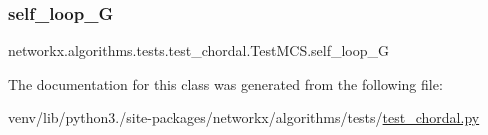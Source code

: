 \subsubsection{\texorpdfstring{self\+\_\+loop\+\_\+G}{self\_loop\_G}}
{\footnotesize\ttfamily networkx.\+algorithms.\+tests.\+test\+\_\+chordal.\+Test\+M\+C\+S.\+self\+\_\+loop\+\_\+G}



The documentation for this class was generated from the following file\+:\begin{DoxyCompactItemize}
\item 
venv/lib/python3./site-\/packages/networkx/algorithms/tests/\hyperlink{test__chordal_8py}{test\+\_\+chordal.\+py}\end{DoxyCompactItemize}
